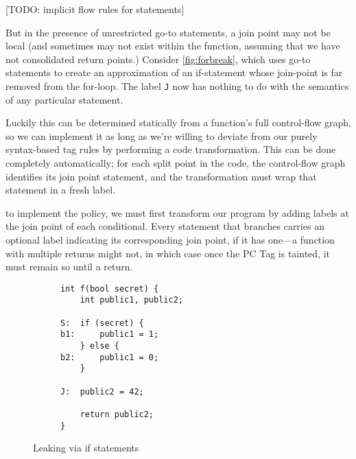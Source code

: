 \documentclass{llncs}
\begin{document}
[TODO: implicit flow rules for statements]

But in the presence of unrestricted go-to statements, a join point may not be
local (and sometimes may not exist within the function, assuming that we have not
consolidated return points.) Consider \cref{fig:forbreak}, which
uses go-to statements to create an approximation of an if-statement whose join-point
is far removed from the for-loop. The label {\tt J} now has nothing to do with the
semantics of any particular statement.

Luckily this can be determined statically from a function's full control-flow graph,
so we can implement it as long as we're willing to deviate from our purely syntax-based
tag rules by performing a code transformation. This can be done completely automatically;
for each split point in the code, the control-flow graph identifies its join point statement,
and the transformation must wrap that statement in a fresh label.

to implement the policy, we must first transform our program
by adding labels at the join point of each conditional.
Every statement that branches carries an optional label indicating its corresponding
join point, if it has one---a function with multiple returns might not, in which case
once the PC Tag is tainted, it must remain so until a return.

\begin{figure}
  \begin{subfigure}{0.4\textwidth}
\begin{verbatim}
int f(bool secret) {
    int public1, public2;

S:  if (secret) {
b1:     public1 = 1;
    } else {
b2:     public1 = 0;
    }

J:  public2 = 42;

    return public2;
}
\end{verbatim}
  \end{subfigure}
  \begin{subfigure}{0.5\textwidth}
  \end{subfigure}
  
  \caption{Leaking via if statements}
  \label{fig:ifthenelse}
\end{figure}
\end{document}
